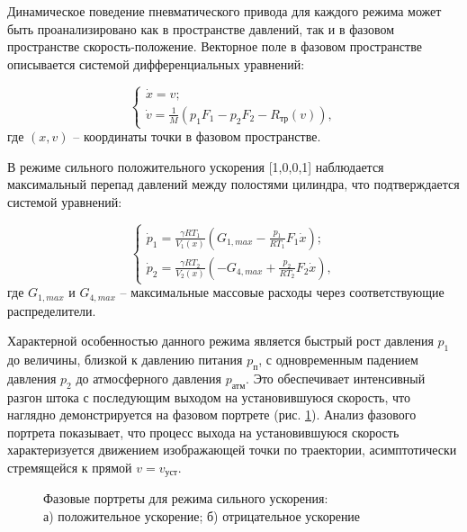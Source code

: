 Динамическое поведение пневматического привода для каждого режима может быть
проанализировано как в пространстве давлений, так и в фазовом пространстве
скорость-положение. Векторное поле в фазовом пространстве описывается системой дифференциальных уравнений:

\begin{equation}
	\begin{cases}
		\dot{x} = v; \\
		\dot{v} = \frac{1}{M}(p_1F_1 - p_2F_2 - R_\text{тр}(v)),
	\end{cases}
\end{equation}
где $(x,v)$ -- координаты точки в фазовом пространстве.

В режиме сильного положительного ускорения [1,0,0,1] наблюдается максимальный
перепад давлений между полостями цилиндра, что подтверждается системой уравнений:

\begin{equation*}
	\begin{cases}
		\dot{p}_1 = \frac{\gamma RT_1}{V_1(x)}\left(G_{1,max} - \frac{p_1}{RT_1}F_1\dot{x}\right); \\
		\dot{p}_2 = \frac{\gamma RT_2}{V_2(x)}\left(-G_{4,max} + \frac{p_2}{RT_2}F_2\dot{x}\right),
	\end{cases}
\end{equation*}
где $G_{1,max}$ и $G_{4,max}$ -- максимальные массовые расходы через соответствующие распределители.

Характерной особенностью данного режима является быстрый рост давления $p_1$ до величины, близкой к давлению питания
$p_\text{п}$, с одновременным падением давления $p_2$ до атмосферного давления $p_\text{атм}$. Это обеспечивает интенсивный
разгон штока с последующим выходом на установившуюся скорость, что наглядно демонстрируется на
фазовом портрете (рис. \ref{fig:pp_strong_accelration}). Анализ фазового портрета показывает,
что процесс выхода на установившуюся скорость характеризуется движением изображающей
точки по траектории, асимптотически стремящейся к прямой $v = v_\text{уст}$.

\begin{figure}[htbp]
	\caption{Фазовые портреты для режима сильного ускорения:\\
		а) положительное ускорение; б) отрицательное ускорение}
	\label{fig:pp_strong_accelration}
\end{figure}


